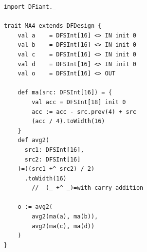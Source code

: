 
\begin{figure}[t!]
  \centering
  \begin{minipage}[b][10cm][t]{0.32\linewidth}
    \centering
    \captionsetup{justification=centering}   
    \begin{verbatim}
			import DFiant._
			
			trait MA4 extends DFDesign {
				val a    = DFSInt[16] <> IN init 0
				val b    = DFSInt[16] <> IN init 0
				val c    = DFSInt[16] <> IN init 0
				val d    = DFSInt[16] <> IN init 0
				val o    = DFSInt[16] <> OUT
				
				def ma(src: DFSInt[16]) = {     
					val acc = DFSInt[18] init 0    
					acc := acc - src.prev(4) + src 
					(acc / 4).toWidth(16)
				}
				def avg2(
				  src1: DFSInt[16], 
				  src2: DFSInt[16]
				)=((src1 +^ src2) / 2)
				  .toWidth(16)
					//  (_ +^ _)=with-carry addition
					
				o := avg2(
					avg2(ma(a), ma(b)), 
					avg2(ma(c), ma(d))
				)
			}
			
			
			
			
			

\end{verbatim}
\end{minipage}
\end{figure}
